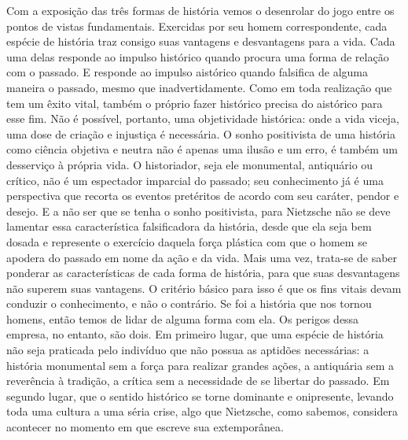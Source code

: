 Com a exposição das três formas de história vemos o desenrolar do jogo
entre os pontos de vistas fundamentais. Exercidas por seu homem
correspondente, cada espécie de história traz consigo suas vantagens e
desvantagens para a vida. Cada uma delas responde ao impulso histórico
quando procura uma forma de relação com o passado. E responde ao impulso
aistórico quando falsifica de alguma maneira o passado, mesmo que
inadvertidamente. Como em toda realização que tem um êxito vital, também
o próprio fazer histórico precisa do aistórico para esse fim. Não é
possível, portanto, uma objetividade histórica: onde a vida viceja, uma
dose de criação e injustiça é necessária. O sonho positivista de uma
história como ciência objetiva e neutra não é apenas uma ilusão e um
erro, é também um desserviço à própria vida. O historiador, seja ele
monumental, antiquário ou crítico, não é um espectador imparcial do
passado; seu conhecimento já é uma perspectiva que recorta os eventos
pretéritos de acordo com seu caráter, pendor e desejo. E a não ser que
se tenha o sonho positivista, para Nietz\-sche não se deve lamentar essa
característica falsificadora da história, desde que ela seja bem dosada
e represente o exercício daquela força plástica com que o homem se
apodera do passado em nome da ação e da vida. Mais uma vez, trata-se de
saber ponderar as características de cada forma de história, para que
suas desvantagens não superem suas vantagens. O critério básico para
isso é que os fins vitais devam conduzir o conhecimento, e não o
contrário. Se foi a história que nos tornou homens, então temos de lidar
de alguma forma com ela. Os perigos dessa empresa, no entanto, são dois.
Em primeiro lugar, que uma espécie de história não seja praticada pelo
indivíduo que não possua as aptidões necessárias: a história monumental
sem a força para realizar grandes ações, a antiquária sem a reverência à
tradição, a crítica sem a necessidade de se libertar do passado. Em
segundo lugar, que o sentido histórico se torne dominante e onipresente,
levando toda uma cultura a uma séria crise, algo que Nietz\-sche, como
sabemos, considera acontecer no momento em que escreve sua extemporânea.

